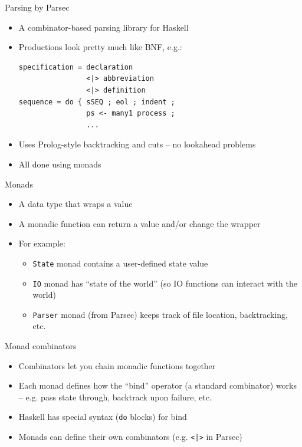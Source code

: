 \documentclass[adam,pdf,slideColor]{prosper}
\begin{document}
\begin{slide}{Parsing by Parsec}
\begin{itemize}
\item A combinator-based parsing library for Haskell
\item Productions look pretty much like BNF, e.g.:
\begin{verbatim}
specification = declaration
                <|> abbreviation
                <|> definition
sequence = do { sSEQ ; eol ; indent ;
                ps <- many1 process ;
                ...
\end{verbatim}
\item Uses Prolog-style backtracking and cuts -- no lookahead problems
\item All done using monads
\end{itemize}
\end{slide}

\begin{slide}{Monads}
\begin{itemize}
\item A data type that wraps a value
\item A monadic function can return a value and/or change the wrapper
\item For example:
\begin{itemize}
\item \verb|State| monad contains a user-defined state value
\item \verb|IO| monad has ``state of the world'' (so IO functions
  can interact with the world)
\item \verb|Parser| monad (from Parsec) keeps track of file location,
  backtracking, etc.
\end{itemize}
\end{itemize}
\end{slide}

\begin{slide}{Monad combinators}
\begin{itemize}
\item Combinators let you chain monadic functions together
\item Each monad defines how the ``bind'' operator (a standard
  combinator) works -- e.g. pass state through, backtrack upon
  failure, etc.
\item Haskell has special syntax (\verb|do| blocks) for bind
\item Monads can define their own combinators (e.g. \verb,<|>, in Parsec)
\end{itemize}
\end{slide}
\end{document}
